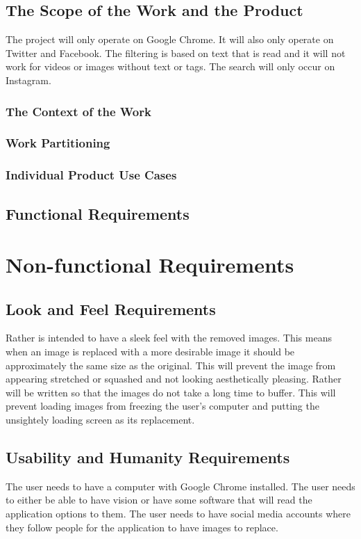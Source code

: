 \documentclass[12pt, titlepage]{article}
\begin{document}
\subsection{The Scope of the Work and the Product}
The project will only operate on Google Chrome. It will also only operate on Twitter and Facebook. The filtering is based on text that is read and it will not work for videos or images without text or tags. The search will only occur on Instagram.

\subsubsection{The Context of the Work}

\subsubsection{Work Partitioning}

\subsubsection{Individual Product Use Cases}

\subsection{Functional Requirements}

\section{Non-functional Requirements}

\subsection{Look and Feel Requirements}
Rather is intended to have a sleek feel with the removed images. This means when an image is replaced with a more desirable image it should be approximately the same size as the original. This will prevent the image from appearing stretched or squashed and not looking aesthetically pleasing. Rather will be written so that the images do not take a long time to buffer. This will prevent loading images from freezing the user's computer and putting the unsightely loading screen as its replacement. 

\subsection{Usability and Humanity Requirements}
The user needs to have a computer with Google Chrome installed. The user needs to either be able to have vision or have some software that will read the application options to them. The user needs to have social media accounts where they follow people for the application to have images to replace. 
\end{document}
